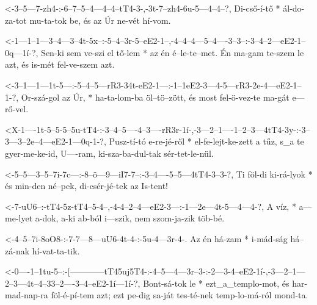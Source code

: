   {<-3--5---7-zh4-:-6--7--5--4---4--4--tT4-3-,-3t-7--zh4-6u-5---4--4--?,}
  {  Di-cső-í-tő  * ál-do-za-tot mu-ta-tok be, és az Úr  ne-vét hí-vom.}

  {<-1---1--1---3--4---3--4t-5x--:-5--4--3r-5--eE2-1--,-4--4--4---5--4----3--3--:-3--4--2---eE2-1--0q---1í-?,}
  {  Sen-ki sem ve-szi el tő-lem * az én é--le-te--met. Én ma-gam te-szem le azt, és is-mét fel-ve-szem azt.}


  {<-3--1---1---1t-5---:-5--4--5---rR3-34t-eE2-1---:-1--1eE2-3---4-5---rR3-2e-4---eE2-1--1-?,}
  {  Or-szá-gol az Úr, * ha-ta-lom-ba  öl--tö--zött, és most fel-ö-vez-te  ma-gát e---rő-vel.}

  {<X-1----1t-5--5-5--5u-tT4-:-3--4--5----4--3----rR3r-1í-,-3---2--1----1--2--3---4tT4-3y-:-3--3---3--2e--4---eE2-1---0q-1-?,}
  {   Pusz-tí-tó e-re-jé-ről * el-fe-lejt-ke-zett a    tűz, s_a te gyer-me-ke-id, U----ram, ki-sza-ba-dul-tak sér-tet-le-nül.}

  {<-5--5---3--5--7i-7c---:-8--ö---9---iI7-7--:-3--4----5--5---4tT4-3--3-?,}
  {  Ti föl-di ki-rá-lyok * és min-den né--pek, di-csér-jé-tek az   Is-tent!}

  {<-7-uU6--:-tT4-5z-tT4--5-4--,-4-4--2--4---eE2-3---:-1---2e---4t-5---4---4-?,}
  {  A víz, * a---me-lyet a-dok, a-ki ab-ból i---szik, nem szom-ja-zik töb-bé.}


  {<-4--5--7i-8oO8-:-7-7---8---uU6-4t-4-:-5u-4---3r-4-.}
  {  Az én há-zam  * i-mád-ság há--zá-nak hí-vat-ta-tik.}


  {<-0----1--1tu-5--:-[------------tT45uj5T4-:-4--5---4---3r--3-:-2---3-4--eE2-1í-,-3---2--1---2--3---4t--4--33--2----3--4--eE2-1í---1í-?,}
  {  Bont-sá-tok le * ezt_a_templo-mot,        és har-mad-nap-ra  föl-é-pí-tem azt; ezt pe-dig sa-ját tes-té-nek temp-lo-má-ról mond-ta.}



